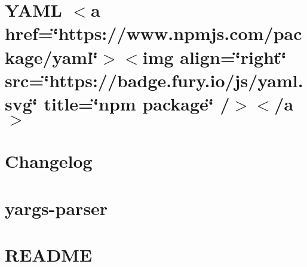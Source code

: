 \documentclass[twoside]{book}
\newcommand{\+}{\discretionary{\mbox{\scriptsize$\hookleftarrow$}}{}{}}
\begin{document}
\chapter{YAML \texorpdfstring{$<$}{<}a href=\char`\"{}https\+://www.\+npmjs.\+com/package/yaml\char`\"{}\texorpdfstring{$>$}{>}\texorpdfstring{$<$}{<}img align=\char`\"{}right\char`\"{} src=\char`\"{}https\+://badge.\+fury.\+io/js/yaml.\+svg\char`\"{} title=\char`\"{}npm package\char`\"{} /\texorpdfstring{$>$}{>}\texorpdfstring{$<$}{<}/a\texorpdfstring{$>$}{>}}
\label{md__c___users_vaishnavi_jadhav__desktop__developer_code_mean_stack_example_client_node_modules_yaml__r_e_a_d_m_e}

\chapter{Changelog}
\label{md__c___users_vaishnavi_jadhav__desktop__developer_code_mean_stack_example_client_node_modules_yargs_parser__c_h_a_n_g_e_l_o_g}

\chapter{yargs-\/parser}
\label{md__c___users_vaishnavi_jadhav__desktop__developer_code_mean_stack_example_client_node_modules_yargs_parser__r_e_a_d_m_e}

\chapter{README}
\label{md__c___users_vaishnavi_jadhav__desktop__developer_code_mean_stack_example_client_node_modules_yargs__r_e_a_d_m_e}

\end{document}
